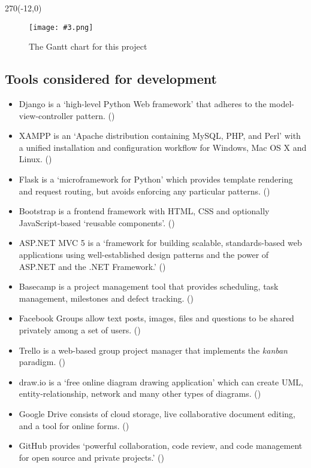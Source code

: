 \documentclass[a4paper,titlepage,12pt]{article}
\newcommand\figimg[4][\textwidth]{
	\begin{figure}
		\caption{#4}
		\label{fig:#2}
		\texttt{[image: \#3.png]}
	\end{figure}
}
\begin{document}
\begin{landscape}
	\quad %
	\thispagestyle{empty}
	\begin{textblock}{270}(-12,0)
		\figimg[270mm]{gantt}{gantt}
			{The Gantt chart for this project}
	\end{textblock}
\end{landscape}

\subsection{Tools considered for development}

\begin{itemize}
	\item Django is a `high-level Python Web framework' that adheres to the
	      model-view-controller pattern.
	      (\cite{Django2014})
	\item XAMPP is an `Apache distribution containing MySQL, PHP, and Perl'
	      with a unified installation and configuration workflow for
	      Windows, Mac OS X and Linux.
	      (\cite{ApacheFriends2014})
	\item Flask is a `microframework for Python' which provides template
	      rendering and request routing, but avoids enforcing any
	      particular patterns.
	      (\cite{Ronacher2014})
	\item Bootstrap is a frontend framework with HTML, CSS and optionally
	      JavaScript-based `reusable components'.
	      (\cite{Twitter2014})
	\item ASP.NET MVC 5 is a `framework for building scalable,
	      standards-based web applications using well-established design
	      patterns and the power of ASP.NET and the .NET Framework.'
	      (\cite{Microsoft2014})
	\item Basecamp is a project management tool that provides scheduling,
	      task management, milestones and defect tracking.
	      (\cite{37signals2004})
	\item Facebook Groups allow text posts, images, files and questions
	      to be shared privately among a set of users.
	      (\cite{Facebook2014})
	\item Trello is a web-based group project manager that implements the
	      \textit{kanban} paradigm.
	      (\cite{FogCreek2014})
	\item draw.io is a `free online diagram drawing application' which can
	      create UML, entity-relationship, network and many other types
	      of diagrams.
	      (\cite{JGraph2014})
	\item Google Drive consists of cloud storage, live collaborative
	      document editing, and a tool for online forms.
	      (\cite{Google2014})
	\item GitHub provides `powerful collaboration, code review, and code
	      management for open source and private projects.'
	      (\cite{GitHub2014})
\end{itemize}
\end{document}
